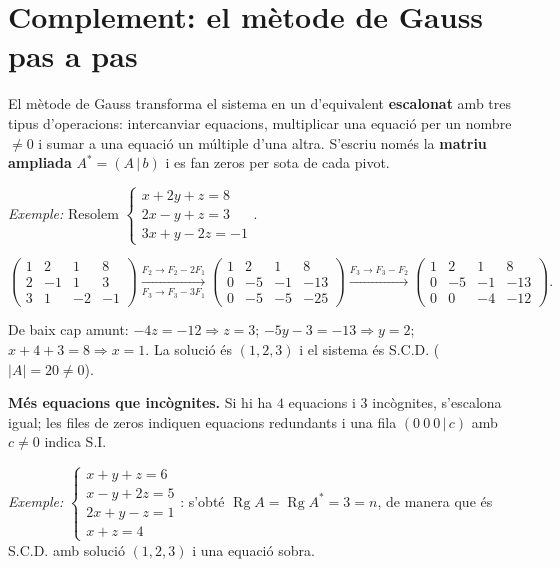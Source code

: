 \section{Complement: el mètode de Gauss pas a pas}

El mètode de Gauss transforma el sistema en un d'equivalent \textbf{escalonat} amb tres tipus d'operacions: intercanviar equacions, multiplicar una equació per un nombre $\neq0$ i sumar a una equació un múltiple d'una altra. S'escriu només la \textbf{matriu ampliada} $A^{*}=(A\,|\,b)$ i es fan zeros per sota de cada pivot.

\emph{Exemple:} Resolem $\begin{cases}x+2y+z=8\\2x-y+z=3\\3x+y-2z=-1\end{cases}$.

\begin{equation*}
\left(\begin{array}{ccc|c}1&2&1&8\\2&-1&1&3\\3&1&-2&-1\end{array}\right)\xrightarrow[F_3\to F_3-3F_1]{F_2\to F_2-2F_1}\left(\begin{array}{ccc|c}1&2&1&8\\0&-5&-1&-13\\0&-5&-5&-25\end{array}\right)\xrightarrow{F_3\to F_3-F_2}\left(\begin{array}{ccc|c}1&2&1&8\\0&-5&-1&-13\\0&0&-4&-12\end{array}\right).
\end{equation*}

De baix cap amunt: $-4z=-12\Rightarrow z=3$; $-5y-3=-13\Rightarrow y=2$; $x+4+3=8\Rightarrow x=1$. La solució és $(1,2,3)$ i el sistema és S.C.D. ($|A|=20\neq0$).

\textbf{Més equacions que incògnites.} Si hi ha $4$ equacions i $3$ incògnites, s'escalona igual; les files de zeros indiquen equacions redundants i una fila $(0\ 0\ 0\,|\,c)$ amb $c\neq0$ indica S.I.

\emph{Exemple:} $\begin{cases}x+y+z=6\\x-y+2z=5\\2x+y-z=1\\x+z=4\end{cases}$: s'obté $\operatorname{Rg}A=\operatorname{Rg}A^{*}=3=n$, de manera que és S.C.D. amb solució $(1,2,3)$ i una equació sobra.

